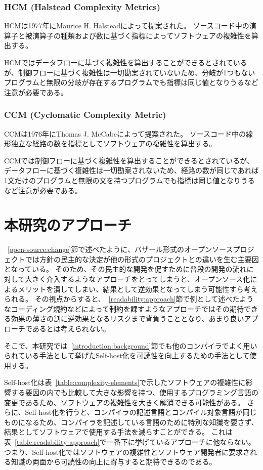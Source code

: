 \subsubsection{HCM (Halstead Complexity Metrics)}

HCMは1977年にMaurice H. Halsteadによって提案された。
ソースコード中の演算子と被演算子の種類および数に基づく指標によってソフトウェアの複雑性を算出する。

HCMではデータフローに基づく複雑性を算出することができるとされているが、制御フローに基づく複雑性は一切勘案されていないため、分岐が1つもないプログラムと無限の分岐が存在するプログラムでも指標は同じ値となりうるなど注意が必要である。

\subsubsection{CCM (Cyclomatic Complexity Metric)}

CCMは1976年にThomas J. McCabeによって提案された。
ソースコード中の線形独立な経路の数を指標としてソフトウェアの複雑性を算出する。

CCMでは制御フローに基づく複雑性を算出することができるとされているが、データフローに基づく複雑性は一切勘案されないため、経路の数が同じであれば1文だけのプログラムと無限の文を持つプログラムでも指標は同じ値となりうるなど注意が必要である。

\section{本研究のアプローチ}
\label{readability:idea}

~\ref{open-source:change}節で述べたように、バザール形式のオープンソースプロジェクトでは方針の民主的な決定が他の形式のプロジェクトとの違いを生む主要因となっている。
そのため、その民主的な開発を促すために普段の開発の流れに対して大きく介入するようなアプローチをとってしまうと、オープンソース化によるメリットを潰してしまい、結果として逆効果となってしまう可能性すら考えられる。
その視点からすると、~\ref{readability:approach}節で例として述べたようなコーディング規約などによって制約を課すようなアプローチではその期待できる効果の薄さの割に逆効果となるリスクまで背負うこととなり、あまり良いアプローチであるとは考えられない。

そこで、本研究では~\ref{introduction:background}節でも他のコンパイラでよく用いられている手法として挙げたSelf-host化を可読性を向上するための手法として使用する。

Self-host化は表~\ref{table:complexity-elements}で示したソフトウェアの複雑性に影響する要因の内でも比較して大きな影響を持つ、使用するプログラミング言語の変更であるため、ソフトウェアの複雑性を大きく解消できる可能性がある。
さらに、Self-host化を行うと、コンパイラの記述言語とコンパイル対象言語が同じものになるため、コンパイラを記述している言語のために特別な知識を要さず、結果としてソフトウェアで使用する手法を減らすことができる。
これは表~\ref{table:readability-approach}で一番下に挙げているアプローチに他ならない。
つまり、Self-host化ではソフトウェアの複雑性とソフトウェア開発者に要求される知識の両面から可読性の向上に寄与すると期待できるのである。

